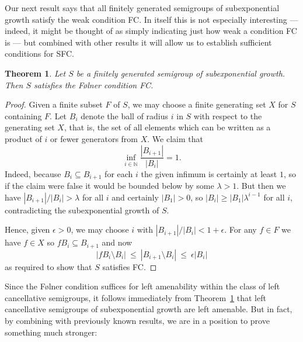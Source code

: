 \documentclass[11pt,a4paper,reqno]{amsart}
\newtheorem{theorem}{Theorem}[section]
\begin{document}
Our next result says that all finitely generated semigroups of
subexponential growth satisfy the weak condition FC. In itself this
is not especially interesting --- indeed, it might be thought of as
simply indicating just how weak a condition FC is --- but combined
with other results it will allow us to establish sufficient conditions
for SFC.

\begin{theorem}\label{thm_polyfc}
Let $S$ be a finitely generated semigroup of subexponential growth. Then
$S$ satisfies the F\o lner condition FC.
\end{theorem}
\begin{proof}
Given a finite subset $F$ of $S$, we may choose a finite generating
set $X$ for $S$ containing $F$. Let $B_i$ denote the
ball of radius $i$ in $S$ with respect to the generating set $X$, that
is, the set of all elements which can be written as a product of $i$ or
fewer generators from $X$. We
claim that
$$\inf_{i \in \mathbb{N}} \frac{|B_{i+1}|}{|B_i|} = 1.$$
Indeed, because $B_{i} \subseteq B_{i+1}$ for each $i$ the given
infimum is certainly at least $1$, so if the claim were false it would
be bounded below by some $\lambda > 1$. But then we have 
$|B_{i+1}| / |B_i| > \lambda$ for all $i$ and certainly $|B_1| > 0$, so
$|B_i| \geq |B_1| \lambda^{i-1}$ for all $i$,
contradicting the subexponential growth of $S$.

Hence, given $\epsilon > 0$, we may choose $i$ with $|B_{i+1}| / |B_i| < 1+\epsilon$.
For any $f \in F$ we have $f \in X$ so $f B_i \subseteq B_{i+1}$ and now
$$|f B_i \setminus B_i| \ \leq \ |B_{i+1} \setminus B_i| \ \leq \ \epsilon |B_i|$$
as required to show that $S$ satisfies FC.
\end{proof}

Since the F\o lner condition suffices for left amenability within the class
of left cancellative semigroups, it follows immediately from
Theorem~\ref{thm_polyfc} that left cancellative semigroups
of subexponential growth are left amenable. But in fact, by combining with
previously known results, we are in a position to prove something much
stronger:
\end{document}
